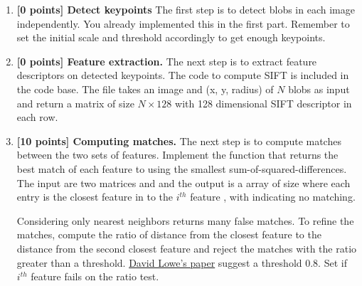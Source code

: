 \begin{enumerate}


\item \textbf{[0 points] Detect keypoints} The first step is to detect blobs in each image independently. You already implemented this in the first part. Remember to set the initial scale and threshold accordingly to get enough keypoints.
      
\item \textbf{[0 points] Feature extraction.} The next step is to extract feature descriptors on detected keypoints. The code to compute SIFT is included in the code base. The file  takes an image and (x, y, radius) of $N$ blobs as input and return a matrix of size $N \times 128$ with 128 dimensional SIFT descriptor in each row.


\item \textbf{[10 points] Computing matches.} The next step is to compute matches between the two sets of features. Implement the function  that returns the best match of each feature  to  using the smallest sum-of-squared-differences. The input are two matrices  and  and the output is a array of size  where each entry  is the closest feature in  to the $i^{th}$ feature , with  indicating no matching.


Considering only nearest neighbors returns many false matches. To refine the matches, compute the ratio of distance from the closest feature to the distance from the second closest feature and reject the matches with the ratio greater than a threshold. \href{http://www.cs.ubc.ca/~lowe/papers/ijcv04.pdf}{David Lowe's paper} suggest a threshold 0.8. Set  if $i^{th}$ feature  fails on the ratio test.



\end{enumerate}
